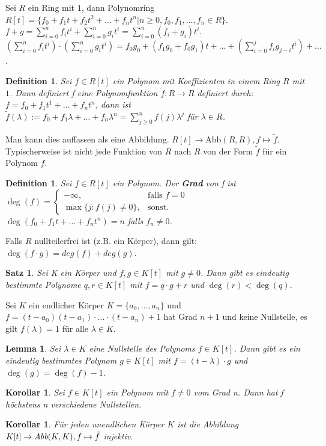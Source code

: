 \documentclass[12pt,a4paper]{article}
\theoremstyle{plain}
\newtheorem{Satz}[Theorem]{Satz}
\newtheorem{Lemma}[Theorem]{Lemma}
\newtheorem{Korollar}[Theorem]{Korollar}
\newtheorem{Definition}[Theorem]{Definition}
\newcommand{\herv}[1]{{\emph{\textbf{#1}}}}
\numberwithin{equation}{section}
\begin{document}
Sei $R$ ein Ring mit $1$, dann Polynomring $R[t]=\{f_0+f_1t+f_2t^2+\ldots+f_nt^n | n\geq 0, f_0,f_1,\ldots,f_n\in R\}$. $f+g=\sum_{i=0}^{n}{f_it^i}+\sum_{i=0}^{n}{g_it^i}=\sum_{i=0}^{n}{(f_i+g_i)t^i}$. $\left(\sum_{i=0}^{n}{f_it^i}\right)\cdot \left(\sum_{i=0}^{n}{g_it^i}\right)=f_0g_0+(f_1g_0+f_0g_1)t+\ldots+\left(\sum_{i=0}^{j}{f_ig_{j-i}t^i}\right)+\ldots$.\\
\begin{Definition}
Sei $f\in R[t]$ ein Polynom mit Koeffizienten in einem Ring $R$ mit $1$. Dann definiert f eine Polynomfunktion $\tilde{f}:R \rightarrow R$ definiert durch: $f=f_0+f_1t^1+\ldots+f_nt^n$, dann ist $\tilde{f}(\lambda):=f_0+f_1\lambda+\ldots+f_n\lambda^n=\sum_{j\geq 0}^n{f(j)\lambda^j}$ für $\lambda\in R$.
\end{Definition}
Man kann dies auffassen als eine Abbildung. $R[t]\rightarrow $Abb$(R,R), f\mapsto \tilde{f}$. Typischerweise ist nicht jede Funktion von $R$ nach $R$ von der Form $\tilde{f}$ für ein Polynom $f$.
\begin{Definition}
Sei $f\in R[t]$ ein Polynom. Der \herv{Grad} von f ist\\ $\deg(f)=\left\lbrace\begin{array}{ll} -\infty,&\text{falls }f=0\\ \max\{j: f(j)\neq 0\},&\text{sonst.}\end{array} \right.$ $\deg(f_0+f_1t+\ldots+f_nt^n)=n$ falls $f_n\neq 0$.
\end{Definition}
Falls $R$ nullteilerfrei ist (z.B. ein Körper), dann gilt: $\deg(f\cdot g)=deg(f)+deg(g)$.
\begin{Satz}
Sei K ein Körper und $f,g\in K[t]$ mit $g\neq 0$. Dann gibt es eindeutig bestimmte Polynome $q,r\in K[t]$ mit $f=q\cdot g+r$ und $\deg(r)<\deg(q)$.
\end{Satz}
Sei $K$ ein endlicher Körper $K=\{a_0,\ldots,a_n\}$ und $f=(t-a_0)(t-a_1)\cdot\ldots\cdot(t-a_n)+1$ hat Grad $n+1$ und keine Nullstelle, es gilt $f(\lambda)=1$ für alle $\lambda\in K$.
\begin{Lemma}
Sei $\lambda\in K$ eine Nullstelle des Polynoms $f\in K[t]$. Dann gibt es ein eindeutig bestimmtes Polynom $g\in K[t]$ mit $f=(t-\lambda)\cdot g$ und $\deg(g)=\deg(f)-1$.
\end{Lemma}
\begin{Korollar}
Sei $f\in K[t]$ ein Polynom mit $f\neq 0$ vom Grad n. Dann hat f höchstens n verschiedene Nullstellen.
\end{Korollar}
\begin{Korollar}
Für jeden unendlichen Körper $K$ ist die Abbildung $K[t]\rightarrow \emph{Abb}(K,K), f\mapsto \tilde{f}$ injektiv.
\end{Korollar}
\end{document}

